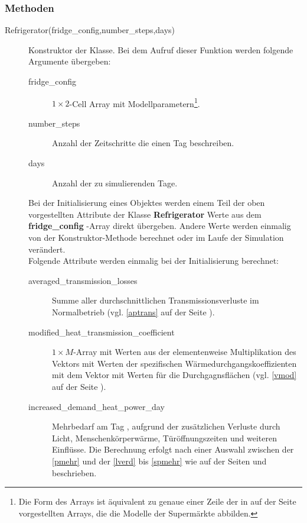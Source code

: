 \subsubsection*{Methoden}
\begin{description}
	\item[Refrigerator(fridge\_config,number\_steps,days)] Konstruktor der
	Klasse. Bei dem Aufruf dieser Funktion werden folgende Argumente
	\"ubergeben:
	\begin{description}
		\item[fridge\_config] $1 \times 2$-Cell Array
		mit Modellparametern\footnote{ Die Form des Arrays ist
		\"aquivalent zu genaue einer Zeile der in
		 auf der Seite \pageref{csuper} vorgestellten
		Arrays, die die Modelle der Superm\"arkte abbilden.}.
		\item[number\_steps] Anzahl der Zeitschritte die einen
		Tag beschreiben.
		\item[days] Anzahl der zu simulierenden Tage.
	\end{description}
	Bei der Initialisierung eines Objektes werden einem Teil der oben
	vorgestellten Attribute der Klasse \textbf{Refrigerator} Werte aus dem
	\textbf{ fridge\_config }-Array direkt \"ubergeben. Andere Werte werden
	einmalig von der Konstruktor-Methode berechnet oder im Laufe der
	Simulation ver\"andert.\\

	Folgende Attribute werden einmalig bei der Initialisierung berechnet:
	\begin{description}
		\item[averaged\_transmission\_losses] Summe aller
		durchschnittlichen Transmissionsverluste im Normalbetrieb
		(vgl. \cref{aptrans} auf der Seite \pageref{aptrans}).
		\item[modified\_heat\_transmission\_coefficient] $1\times
		M$-Array mit Werten aus der elementenweise Multiplikation des
		Vektors mit Werten der spezifischen
		W\"armedurchgangskoeffizienten mit dem Vektor mit Werten f\"ur
		die Durchgagnsfl\"achen (vgl. \cref{vmod} auf der Seite
		\pageref{vmod}).
		\item[increased\_demand\_heat\_power\_day] Mehrbedarf am Tag ,
		aufgrund der zus\"atzlichen Verluste durch Licht,
		Menschenk\"orperw\"arme, T\"ur\"offnungszeiten und weiteren
		Einfl\"usse. Die Berechnung erfolgt nach einer Auswahl
		zwischen der \cref{pmehr} und der \cref{lverd} bis \cref{spmehr}
		wie auf der Seiten \pageref{pmehr} und \pageref{spmehr}
		beschrieben.
	\end{description}


\end{description}
